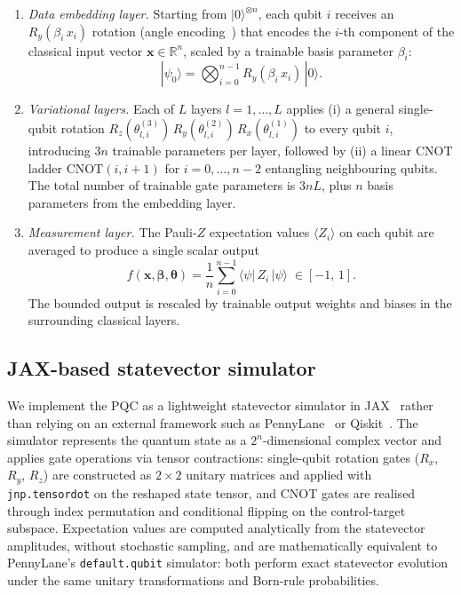 \documentclass[11pt,a4paper]{article}
\begin{document}
\begin{enumerate}
  \item \emph{Data embedding layer.} Starting from $|0\rangle^{\otimes n}$, each qubit $i$ receives an $R_y(\beta_i\, x_i)$ rotation (angle encoding~\cite{schuld2021machine}) that encodes the $i$-th component of the classical input vector $\mathbf{x} \in \mathbb{R}^n$, scaled by a trainable basis parameter $\beta_i$:
    \begin{equation}
      |\psi_0\rangle = \bigotimes_{i=0}^{n-1} R_y(\beta_i\, x_i)\,|0\rangle.
    \end{equation}

  \item \emph{Variational layers.} Each of $L$ layers $l = 1, \ldots, L$ applies (i) a general single-qubit rotation $R_z(\theta^{(3)}_{l,i})\, R_y(\theta^{(2)}_{l,i})\, R_x(\theta^{(1)}_{l,i})$ to every qubit $i$, introducing $3n$ trainable parameters per layer, followed by (ii) a linear CNOT ladder $\text{CNOT}(i, i{+}1)$ for $i = 0, \ldots, n{-}2$ entangling neighbouring qubits. The total number of trainable gate parameters is $3nL$, plus $n$ basis parameters from the embedding layer.

  \item \emph{Measurement layer.} The Pauli-$Z$ expectation values $\langle Z_i \rangle$ on each qubit are averaged to produce a single scalar output
    \begin{equation}
      f(\mathbf{x}, \boldsymbol{\beta}, \boldsymbol{\theta})
      = \frac{1}{n} \sum_{i=0}^{n-1} \langle\psi|\, Z_i \,|\psi\rangle
      \;\in [-1,\, 1].
      \label{eq:pqc_output}
    \end{equation}
    The bounded output is rescaled by trainable output weights and biases in the surrounding classical layers.
\end{enumerate}

\subsection{JAX-based statevector simulator}
\label{sec:methods_statevector}

We implement the PQC as a lightweight statevector simulator in JAX~\citep{jax2018github} rather than relying on an external framework such as PennyLane~\citep{bergholm2022pennylaneautomaticdifferentiationhybrid} or Qiskit~\citep{javadiabhari2024quantumcomputingqiskit}. The simulator represents the quantum state as a $2^n$-dimensional complex vector and applies gate operations via tensor contractions: single-qubit rotation gates ($R_x$, $R_y$, $R_z$) are constructed as $2\!\times\!2$ unitary matrices and applied with \texttt{jnp.tensordot} on the reshaped state tensor, and CNOT gates are realised through index permutation and conditional flipping on the control-target subspace. Expectation values are computed analytically from the statevector amplitudes, without stochastic sampling, and are mathematically equivalent to PennyLane's \texttt{default.qubit} simulator: both perform exact statevector evolution under the same unitary transformations and Born-rule probabilities.
\end{document}
